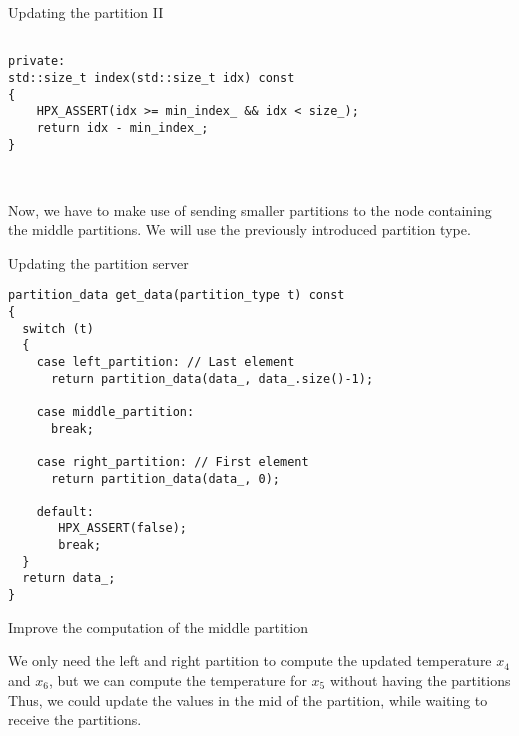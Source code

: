 \documentclass[\classoption]{beamer}
\begin{document}
\begin{frame}[fragile]{Updating the partition II }

\begin{lstlisting}

private:
std::size_t index(std::size_t idx) const
{
	HPX_ASSERT(idx >= min_index_ && idx < size_);
    return idx - min_index_;
}

	
\end{lstlisting}
\vspace{1cm}
Now, we have to make use of sending smaller partitions to the node containing the middle partitions. We will use the previously introduced partition type. 

\end{frame}


\begin{frame}[fragile]{Updating the partition server}

\begin{lstlisting}
partition_data get_data(partition_type t) const
{
  switch (t)
  {
    case left_partition: // Last element
      return partition_data(data_, data_.size()-1);

    case middle_partition:
      break;

    case right_partition: // First element
      return partition_data(data_, 0);

    default:
       HPX_ASSERT(false);
       break;
  }
  return data_;
}

\end{lstlisting}


\end{frame}

\begin{frame}{Improve the computation of the middle partition}

\begin{center}
\end{center}

We only need the left and right partition to compute the updated temperature $x_4$ and $x_6$, but we can compute the temperature for $x_5$ without having the partitions Thus, we could update the values in the mid of the partition, while waiting to receive the partitions.

\end{frame}
\end{document}
